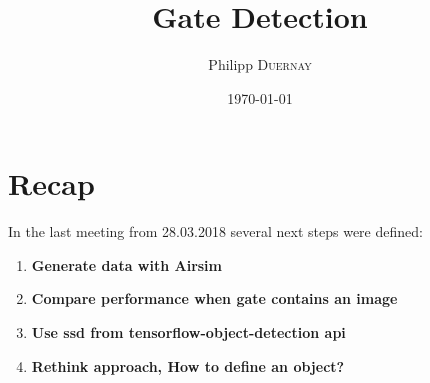 \documentclass{article}
\title{Gate Detection} %
\author{Philipp \textsc{Duernay}} %
\date{\today} %
\begin{document}
\maketitle


\section{Recap}
In the last meeting from 28.03.2018 several next steps were defined:
\begin{enumerate}
	\item \textbf{Generate data with Airsim}
	\item \textbf{Compare performance when gate contains an image}
	\item \textbf{Use ssd from tensorflow-object-detection api}
	\item \textbf{Rethink approach, How to define an object?}
\end{enumerate}
\end{document}
